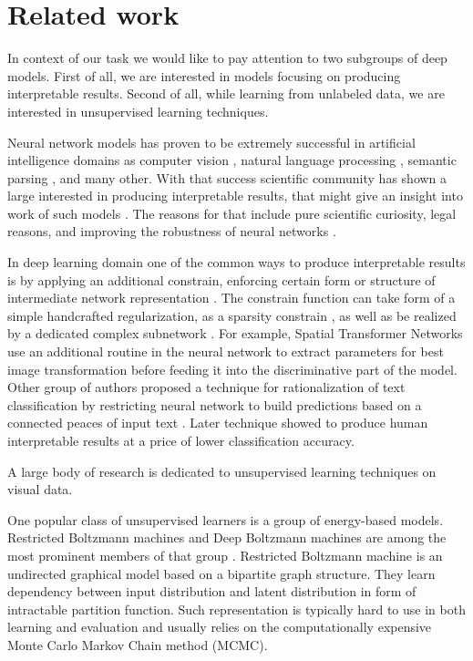 
\chapter{Related work}\label{ch:rewo}

In context of our task we would like to pay attention to two subgroups of deep models.
First of all, we are interested in models focusing on producing interpretable results.
Second of all, while learning from unlabeled data, we are interested in unsupervised learning techniques.

Neural network models has proven to be extremely successful in artificial intelligence domains as computer vision \cite{ILSVRC15}, natural language processing \cite{NIPS2013_5021}, semantic parsing \cite{bordes2012}, and many other.
With that success scientific community has shown a large interested in producing interpretable results, that might give an insight into work of such models \cite{Yosinski2015, Mahendran2014, Zeiler2014, Lei2016}.
The reasons for that include pure scientific curiosity, legal reasons, and improving the robustness of neural networks \cite{Goodfellow2015}.

In deep learning domain one of the common ways to produce interpretable results is by applying an additional constrain, enforcing certain form or structure of intermediate network representation  \cite{Jaderberg2015, Lei2016, Kulkarni2015}.
The constrain function can take form of a simple handcrafted regularization, as a sparsity constrain \cite{Ng2011}, as well as be realized by a dedicated complex subnetwork \cite{Lei2016, Li2015}.
For example, Spatial Transformer Networks \cite{Jaderberg2015} use an additional routine in the neural network to extract parameters for best image transformation before feeding it into the discriminative part of the model.
Other group of authors proposed a technique for rationalization of text classification by restricting neural network to build predictions based on a connected peaces of input text \cite{Lei2016}.
Later technique showed to produce human interpretable results at a price of lower classification accuracy.

A large body of research is dedicated to unsupervised learning techniques on visual data.

One popular class of unsupervised learners is a group of energy-based models.
Restricted Boltzmann machines and Deep Boltzmann machines are among the most prominent members of that group \cite{Ackley1985, Salakhutdinov2009}.
Restricted Boltzmann machine is an undirected graphical model based on a bipartite graph structure.
They learn dependency between input distribution and latent distribution in form of intractable partition function.
Such representation is typically hard to use in both learning and evaluation and usually relies on the computationally expensive Monte Carlo Markov Chain method (MCMC).

